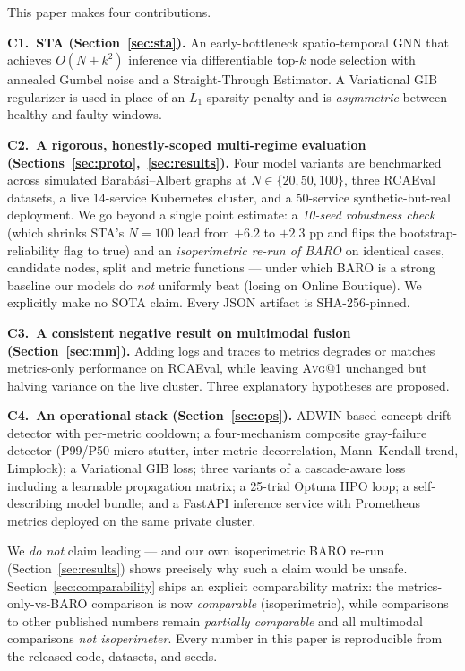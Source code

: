 \documentclass[11pt,a4paper]{article}
\makeatletter
\newcommand{\Avg}[1]{\textsc{Avg}@{#1}}
\newcommand{\STA}{\textsc{STA}}
\makeatother
\begin{document}
This paper makes four contributions.

\textbf{C1.~\STA{} (Section~\ref{sec:sta}).} An early-bottleneck spatio-temporal
GNN that achieves $O(N + k^{2})$ inference via differentiable top-$k$ node
selection with annealed Gumbel noise and a Straight-Through Estimator. A
Variational GIB regularizer is used in place of an $L_1$ sparsity penalty
and is \emph{asymmetric} between healthy and faulty windows.

\textbf{C2.~A rigorous, honestly-scoped multi-regime evaluation
(Sections~\ref{sec:proto},~\ref{sec:results}).} Four model variants are
benchmarked across simulated Barab\'asi--Albert graphs at $N \in \{20,50,100\}$,
three RCAEval datasets, a live 14-service Kubernetes cluster, and a 50-service
synthetic-but-real deployment. We go beyond a single point estimate: a
\emph{10-seed robustness check} (which shrinks \STA{}'s $N{=}100$ lead from
$+6.2$ to $+2.3$ pp and flips the bootstrap-reliability flag to true) and an
\emph{isoperimetric re-run of BARO} on identical cases, candidate nodes, split
and metric functions --- under which BARO is a strong baseline our models do
\emph{not} uniformly beat (losing on Online Boutique). We explicitly make no
SOTA claim. Every JSON artifact is SHA-256-pinned.

\textbf{C3.~A consistent negative result on multimodal fusion
(Section~\ref{sec:mm}).} Adding logs and traces to metrics degrades or matches
metrics-only performance on RCAEval, while leaving \Avg{1} unchanged but
halving variance on the live cluster. Three explanatory hypotheses are
proposed.

\textbf{C4.~An operational stack (Section~\ref{sec:ops}).} ADWIN-based
concept-drift detector with per-metric cooldown; a four-mechanism composite
gray-failure detector (P99/P50 micro-stutter, inter-metric decorrelation,
Mann--Kendall trend, Limplock); a Variational GIB loss; three variants of a
cascade-aware loss including a learnable propagation matrix; a 25-trial
Optuna HPO loop; a self-describing model bundle; and a FastAPI inference
service with Prometheus metrics deployed on the same private cluster.

We \emph{do not} claim leading --- and our own isoperimetric BARO
re-run (Section~\ref{sec:results}) shows precisely why such a claim would be
unsafe. Section~\ref{sec:comparability} ships an explicit comparability matrix:
the metrics-only-vs-BARO comparison is now \emph{comparable} (isoperimetric),
while comparisons to other published numbers remain \emph{partially comparable}
and all multimodal comparisons \emph{not isoperimeter}. Every number in this
paper is reproducible from the released code, datasets, and seeds.
\end{document}

